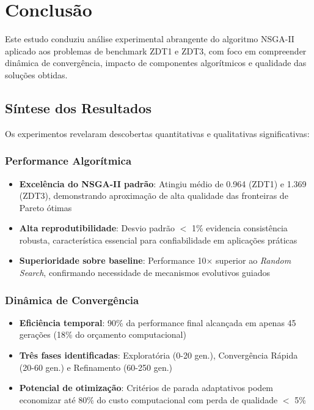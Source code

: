 
\section{Conclusão}

Este estudo conduziu análise experimental abrangente do algoritmo NSGA-II aplicado aos problemas de benchmark ZDT1 e ZDT3, com foco em compreender dinâmica de convergência, impacto de componentes algorítmicos e qualidade das soluções obtidas.

\subsection{Síntese dos Resultados}

Os experimentos revelaram descobertas quantitativas e qualitativas significativas:

\subsubsection{Performance Algorítmica}

\begin{itemize}
    \item \textbf{Excelência do NSGA-II padrão}: Atingiu \hlv{} médio de 0.964 (ZDT1) e 1.369 (ZDT3), demonstrando aproximação de alta qualidade das fronteiras de Pareto ótimas
    
    \item \textbf{Alta reprodutibilidade}: Desvio padrão $<$ 1\% evidencia consistência robusta, característica essencial para confiabilidade em aplicações práticas
    
    \item \textbf{Superioridade sobre baseline}: Performance 10× superior ao \textit{Random Search}, confirmando necessidade de mecanismos evolutivos guiados
\end{itemize}

\subsubsection{Dinâmica de Convergência}

\begin{itemize}
    \item \textbf{Eficiência temporal}: 90\% da performance final alcançada em apenas 45 gerações (18\% do orçamento computacional)
    
    \item \textbf{Três fases identificadas}: Exploratória (0-20 gen.), Convergência Rápida (20-60 gen.) e Refinamento (60-250 gen.)
    
    \item \textbf{Potencial de otimização}: Critérios de parada adaptativos podem economizar até 80\% do custo computacional com perda de qualidade $<$ 5\%
\end{itemize}

